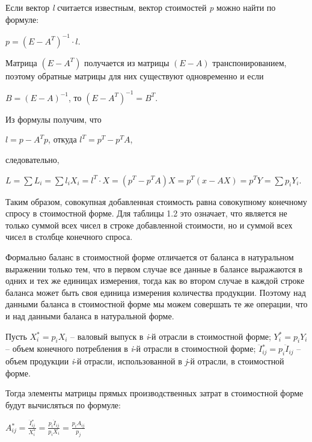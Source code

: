 \documentclass[12pt, 4paper]{book}
\begin{document}
{Если вектор \textit{l} считается известным, вектор стоимостей \textit{p} можно найти по формуле:
\begin{center}
	$ p = (E - A^T)^{-1} \cdot l $.
\end{center}
\par
	
Матрица $ (E - A^T) $ получается из матрицы $ (E - A) $ транспонированием, поэтому обратные матрицы для них существуют одновременно и если
\begin{center}
$ B = (E - A)^{-1} $, то $ (E - A^T)^{-1} = B^T $.
\end{center}
\par

Из формулы  получим, что
\begin{center}
	$ l = p - A^Tp $, откуда $ l^T = p^T - p^TA $,
\end{center}
следовательно,
\begin{center}
	$ L = \sum L_i = \sum {l_iX_i} = l^T \cdot X = (p^T - p^TA)X = p^T(x-AX) = p^TY = \sum {p_i Y_i}$.
\end{center}
Таким образом, совокупная добавленная стоимость равна совокупному конечному спросу в стоимостной форме. Для таблицы 1.2 это означает, что  является не только суммой всех чисел в строке добавленной стоимости, но и суммой всех чисел в столбце конечного спроса.
\par

Формально баланс в стоимостной форме отличается от баланса в натуральном выражении только тем, что в первом случае все данные в балансе выражаются в одних и тех же единицах измерения, тогда как во втором случае в каждой строке баланса может быть своя единица измерения количества продукции. Поэтому над данными баланса в стоимостной форме мы можем совершать те же операции, что и над данными баланса в натуральной форме.
\par

Пусть  $ X{}_i^* = p_i X_i $ – валовый выпуск в \textit{i}-й отрасли в стоимостной форме; $ Y{}_i^* = p_iY_i $ – объем конечного потребления в \textit{i}-й отрасли в стоимостной форме; $ \ddot{I}{}_{ij}^* = p_i \ddot{I}_{ij} $ – объем продукции \textit{i}-й отрасли, использованной в \textit{j}-й отрасли, в стоимостной форме.
\par

Тогда элементы матрицы прямых производственных затрат в стоимостной форме будут вычисляться по формуле:
\begin{center}
	$A{}_{ij}^* = \frac{\ddot{I}{}_{ij}^*}{X{}_i^*} = \frac{p_i\ddot{I}_{ij}}{p_i X_i} = \frac{p_i A_{ij}}{p_j}$
\end{center}
\par

}
\end{document}
